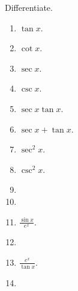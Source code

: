 Differentiate.

\begin{multicols}{2}
\begin{enumerate}
\item $\tan x$.

\item $\cot x$.

\item $\sec x$.

\item $\csc x$.

\item $\sec x\tan x$.

\item $\sec x+\tan x$.

\item $\sec^2 x$.

\item $\csc^2 x$.


\item 

\item 
\item $\displaystyle \frac{\sin x}{e^x}$.

\item 
\item $\displaystyle \frac{e^x}{\tan x}$.

\item 
\end{enumerate}

\end{multicols}